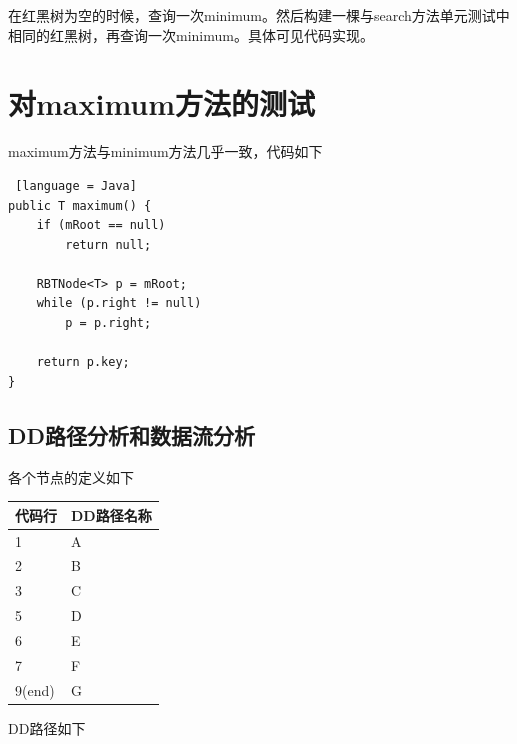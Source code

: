 \documentclass[12pt, a4paper, oneside]{ctexart}
\begin{document}
在红黑树为空的时候，查询一次minimum。然后构建一棵与search方法单元测试中相同的红黑树，再查询一次minimum。具体可见代码实现。

\section{对maximum方法的测试}

maximum方法与minimum方法几乎一致，代码如下

\begin{lstlisting} [language = Java]
public T maximum() {
    if (mRoot == null)
        return null;

    RBTNode<T> p = mRoot;
    while (p.right != null)
        p = p.right;

    return p.key;
}
\end{lstlisting}

\subsection{DD路径分析和数据流分析}

各个节点的定义如下

\begin{table}[!h]
    \begin{tabular}{|l|l|}
    \hline
    代码行 & DD路径名称\\ \hline
    1 & A\\ \hline
    2 & B\\ \hline
    3 & C \\ \hline
    5 & D \\ \hline
    6 & E \\ \hline
    7 & F \\ \hline
    9(end) & G \\ \hline
    \end{tabular}
\end{table}

DD路径如下
\end{document}

